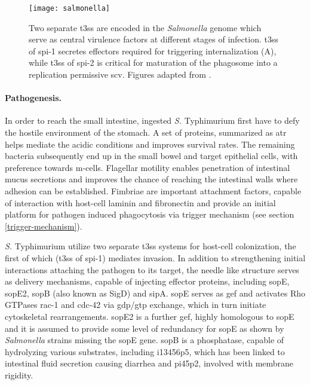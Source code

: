 \begin{figure}[t]
  \centering
  \texttt{[image: salmonella]}
  \caption[Overview of mechanisms for infection of epithelial cells by \textit{Salmonella} and establishing an intracellular replicatory niche.]{Two separate \gls{t3ss} are encoded in the \textit{Salmonella} genome which serve as central virulence factors at different stages of infection. \Gls{t3ss} of \acrshort{spi}-1 secretes effectors required for triggering internalization (A), while \gls{t3ss} of \acrshort{spi}-2 is critical for maturation of the phagosome into a replication permissive \gls{scv}. Figures adapted from \cite{Haraga2008}.}
  \label{fig:salmonella}
\end{figure}

\paragraph{Pathogenesis.}
In order to reach the small intestine, ingested \textit{S.} Typhimurium first have to defy the hostile environment of the stomach. A set of proteins, summarized as \gls{atr} helps mediate the acidic conditions and improves survival rates. The remaining bacteria subsequently end up in the small bowel and target epithelial cells, with preference towards \gls{m-cells}. Flagellar motility enables penetration of intestinal mucus secretions and improves the chance of reaching the intestinal walls where adhesion can be established. Fimbriae are important attachment factors, capable of interaction with host-cell laminin and fibronectin and provide an initial platform for pathogen induced phagocytosis via trigger mechanism (see section \ref{trigger-mechanism}). 

\textit{S.} Typhimurium utilize two separate \gls{t3ss} systems for host-cell colonization, the first of which (\gls{t3ss} of \acrshort{spi}-1) mediates invasion. In addition to strengthening initial interactions attaching the pathogen to its target, the needle like structure serves as delivery mechanisms, capable of injecting effector proteins, including \acrshort{sop}E, \acrshort{sop}E2, \acrshort{sop}B (also known as SigD) and \gls{sip}A. \Acrshort{sop}E serves as \gls{gef} and activates Rho GTPases \gls{rac-1} and \gls{cdc-42} via \acrshort{gdp}/\acrshort{gtp} exchange, which in turn initiate cytoskeletal rearrangements. \Acrshort{sop}E2 is a further \gls{gef}, highly homologous to \acrshort{sop}E and it is assumed to provide some level of redundancy for \acrshort{sop}E as shown by \textit{Salmonella} strains missing the \acrshort{sop}E gene. \Acrshort{sop}B is a phosphatase, capable of hydrolyzing various substrates, including \gls{i13456p5}, which has been linked to intestinal fluid secretion causing diarrhea and \gls{pi45p2}, involved with membrane rigidity. 

